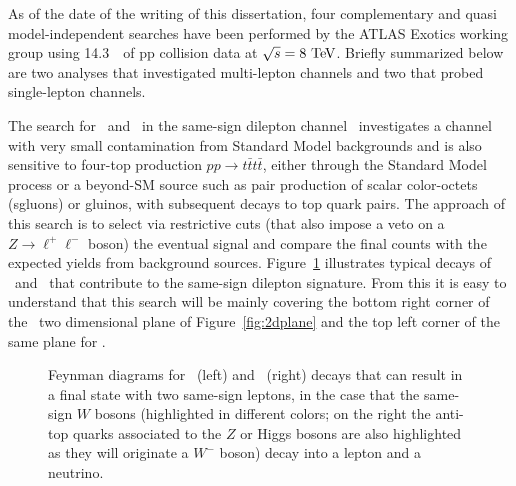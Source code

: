 As of the date of the writing of this dissertation, four complementary 
and quasi model-independent searches have been performed by the ATLAS Exotics working
group using 14.3~\ifb\ of pp collision data at 
$\sqrt{s}=8\tev$.  Briefly summarized below are
two analyses that investigated multi-lepton channels and two that probed 
single-lepton channels.

The search for \BB\ and \TT\ in the same-sign 
dilepton channel~\cite{ATLAS-CONF-2013-051}
investigates a channel
with very small contamination from Standard Model backgrounds and
is also sensitive to four-top production $pp\to t\bar{t}t\bar{t}$, 
either through the Standard Model process or a beyond-SM source such as 
pair production of scalar color-octets (sgluons) or gluinos, with subsequent 
decays to top quark pairs.
The approach of this search is to select via restrictive cuts (that also
impose a veto on a $Z\to \ell^+\ell^-$ boson) the eventual signal
and compare the final counts with the expected yields from background sources.
Figure~\ref{fig:feyndSS} illustrates typical decays of \BB\ and \TT\ 
that contribute to the same-sign dilepton signature. From this it is easy to
understand that this search will be mainly covering the bottom right corner
of the \BBbar\ two dimensional plane of Figure~\ref{fig:2dplane} and the top 
left corner of the same plane for \TTbar.

\begin{figure}[hbt]
\begin{center}
        \myskip\myskip
	\caption{Feynman diagrams for \BBbar\ (left) and \TTbar\ (right)
        decays that can result in a final state with two same-sign leptons,
        in the case that the same-sign $W$ bosons (highlighted in different colors;
        on the right the anti-top quarks associated to the $Z$ or Higgs bosons are
        also highlighted as they will originate a $W^{-}$ boson) decay
        into a lepton and a neutrino. \label{fig:feyndSS}}
\end{center}
\end{figure}


